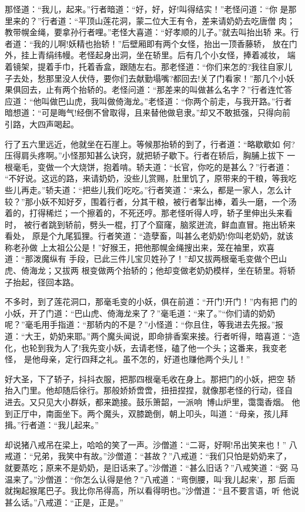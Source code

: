 那怪道：“我儿，起来。”行者暗道：“好，好，好!叫得结实！”老怪问道：“你
是那里来的？”行者道：“平顶山莲花洞，蒙二位大王有令，差来请奶奶去吃唐僧
肉；教带幌金绳，要拿孙行者哩。”老怪大喜道：“好孝顺的儿子。”就去叫抬出轿
来。行者道：“我的儿啊!妖精也抬轿！”后壁厢即有两个女怪，抬出一顶香藤轿，
放在门外，挂上青绢纬幔。老怪起身出洞，坐在轿里。后有几个小女怪，捧着减妆，
端着镜架，提着手巾，托着香盒，跟随左右。那老怪道：“你们来怎的?我往自家儿
子去处，愁那里没人伏侍，要你们去献勤塌嘴?都回去!关了门看家！”那几个小妖
果俱回去，止有两个抬轿的。老怪问道：“那差来的叫做甚么名字？”行者连忙答
应道：“他叫做巴山虎，我叫做倚海龙。”老怪道：“你两个前走，与我开路。”行者
暗想道：“可是晦气!经倒不曾取得，且来替他做皂隶。”却又不敢抵强，只得向前
引路，大四声喝起。

行了五六里远近，他就坐在石崖上。等候那抬轿的到了，行者道：“略歇歇如
何?压得肩头疼啊。”小怪那知甚么诀窍，就把轿子歇下。行者在轿后，胸脯上拔下
一根毫毛，变做一个大烧饼，抱着啃。轿夫道：“长官，你吃的是甚么？”行者道：
“不好说。这远的路，来请奶奶，没些儿赏赐，肚里饥了，原带来的干粮，等我吃
些儿再走。”轿夫道：“把些儿我们吃吃。”行者笑道：“来么，都是一家人，怎么计
较？”那小妖不知好歹，围着行者，分其干粮，被行者掣出棒，着头一磨，一个汤
着的，打得稀烂；一个擦着的，不死还哼。那老怪听得人哼，轿子里伸出头来看时，
被行者跳到轿前，劈头一棍，打了个窟窿，脑浆迸流，鲜血直冒。拖出轿来看处，
原是个九尾狐狸。行者笑道：“造孽畜，叫甚么老奶奶!你叫老奶奶，就该称老孙做
上太祖公公是！”好猴王，把他那幌金绳搜出来，笼在袖里，欢喜道：“那泼魔纵有
手段，已此三件儿宝贝姓孙了！”却又拔两根毫毛变做个巴山虎、倚海龙；又拔两
根变做两个抬轿的；他却变做老奶奶模样，坐在轿里。将轿子抬起，径回本路。

不多时，到了莲花洞口，那毫毛变的小妖，俱在前道：“开门!开门！”内有把
门的小妖，开了门道：“巴山虎、倚海龙来了？”毫毛道：“来了。”“你们请的奶奶
呢？”毫毛用手指道：“那轿内的不是？”小怪道：“你且住，等我进去先报。”报
道：“大王，奶奶来耶。”两个魔头闻说，即命排香案来接。行者听得，暗喜道：“造
化，也轮到我为人了!我先变小妖，去请老怪，磕了他一个头；这番来，我变老怪，
是他母亲，定行四拜之礼。虽不怎的，好道也赚他两个头儿！”

好大圣，下了轿子，抖抖衣服，把那四根毫毛收在身上。那把门的小妖，把空
轿抬入门里。他却随后徐行。那般娇娇啻啻，扭扭捏捏，就像那老怪的行动，径自
进去。又只见大小群妖，都来跪接。鼓乐箫韶，一派响；博山炉里，霭霭香烟。
他到正厅中，南面坐下。两个魔头，双膝跪倒，朝上叩头，叫道：“母亲，孩儿拜
揖。”行者道：“我儿起来。”

却说猪八戒吊在梁上，哈哈的笑了一声。沙僧道：“二哥，好啊!吊出笑来也！”
八戒道：“兄弟，我笑中有故。”沙僧道：“甚故？”八戒道：“我们只怕是奶奶来了，
就要蒸吃；原来不是奶奶，是旧话来了。”沙僧道：“甚么旧话？”八戒笑道：“弼
马温来了。”沙僧道：“你怎么认得是他？”八戒道：“弯倒腰，叫‘我儿起来’，那
后面就掬起猴尾巴子。我比你吊得高，所以看得明也。”沙僧道：“且不要言语，听
他说甚么话。”八戒道：“正是，正是。”

